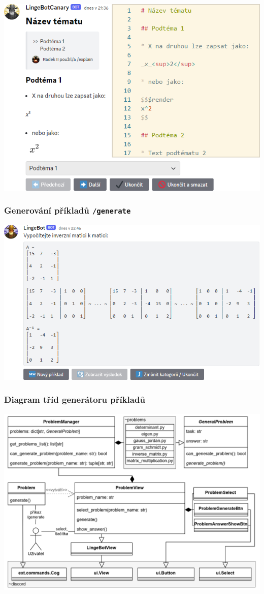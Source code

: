 \documentclass[FM]{tulpresentation} %
\begin{document}
	\begin{frame}[plain]
		\includegraphics[width=.95\paperwidth]{img/idk4}
	\end{frame}
	
	\begin{frame}\frametitle{Generování příkladů \texttt{/generate}}
		\includegraphics[width=.95\paperwidth]{img/idk5}
	\end{frame}
	
	\begin{frame}[plain]\frametitle{Diagram tříd generátoru příkladů}
		\includegraphics[width=.95\paperwidth]{img/idk6}
	\end{frame}
	
\end{document}
